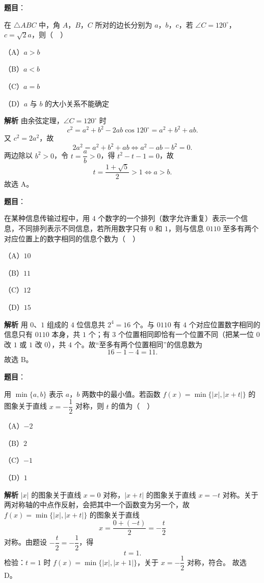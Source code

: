 \begin{answer}

\textbf{题目}：

在 $\triangle ABC$ 中，角 $A$，$B$，$C$ 所对的边长分别为 $a$，$b$，$c$，若 $\angle C=120^\circ$，$c=\sqrt2a$，则（　）

（A）$a>b$

（B）$a<b$

（C）$a=b$

（D）$a$ 与 $b$ 的大小关系不能确定

\textbf{解析}
由余弦定理，$\angle C=120^\circ$ 时
\nopagebreak[4]
\[c^2=a^2+b^2-2ab\cos120^\circ=a^2+b^2+ab.\]
又 $c^2=2a^2$，故
\nopagebreak[4]
\[2a^2=a^2+b^2+ab\iff a^2-ab-b^2=0.\]
两边除以 $b^2>0$，令 $t=\dfrac ab>0$，得 $t^2-t-1=0$，故
\nopagebreak[4]
\[t=\frac{1+\sqrt5}{2}>1\iff a>b.\]
故选 A。


\end{answer}
\begin{answer}

\textbf{题目}：

在某种信息传输过程中，用 $4$ 个数字的一个排列（数字允许重复）表示一个信息，不同排列表示不同信息，若所用数字只有 $0$ 和 $1$，则与信息 $0110$ 至多有两个对应位置上的数字相同的信息个数为（　）

（A）$10$

（B）$11$

（C）$12$

（D）$15$

\textbf{解析}
用 $0$、$1$ 组成的 $4$ 位信息共 $2^4=16$ 个。与 $0110$ 有 $4$ 个对应位置数字相同的信息只有 $0110$ 本身，共 $1$ 个；有 $3$ 个位置相同即恰有一个位置不同（把某一位 $0$ 改 $1$ 或 $1$ 改 $0$），共 $4$ 个。故“至多有两个位置相同”的信息数为
\nopagebreak[4]
\[16-1-4=11.\]
故选 B。


\end{answer}
\begin{answer}

\textbf{题目}：

用 $\min\{a,b\}$ 表示 $a$，$b$ 两数中的最小值。若函数 $f(x)=\min\{|x|,|x+t|\}$ 的图象关于直线 $x=-\dfrac12$ 对称，则 $t$ 的值为（　）

（A）$-2$

（B）$2$

（C）$-1$

（D）$1$

\textbf{解析}
$|x|$ 的图象关于直线 $x=0$ 对称，$|x+t|$ 的图象关于直线 $x=-t$ 对称。关于两对称轴的中点作反射，会把其中一个函数变为另一个，故 $f(x)=\min\{|x|,|x+t|\}$ 的图象关于直线
\nopagebreak[4]
\[x=\frac{0+(-t)}2=-\frac t2\]
对称。由题设 $-\dfrac t2=-\dfrac12$，得
\nopagebreak[4]
\[t=1.\]
检验：$t=1$ 时 $f(x)=\min\{|x|,|x+1|\}$，关于 $x=-\dfrac12$ 对称，符合。
故选 D。


\end{answer}
